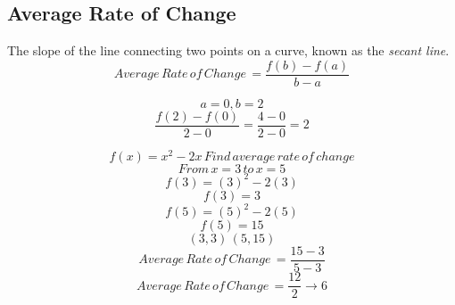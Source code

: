 \subsection{Average Rate of Change}
\begin{definition}
  The slope of the line connecting two points on a curve, known as the \textit{secant line}.
  $$Average \, Rate \, of \, Change \, = \frac{f(b) - f(a)}{b - a}$$
\end{definition}

\begin{example}[Graph] 
  \hfill
  \begin{center}
  \end{center}
  $$a = 0, b = 2$$
  $$\frac{f(2) - f(0)}{2 - 0} = \frac{4 - 0}{2 - 0} = 2$$
\end{example}

\begin{example}[Algebraic]
  $$f(x) = x^2 - 2x \, Find \, average \, rate \, of \, change$$
  $$From \, x = 3 \, to \, x = 5$$
  $$f(3) = (3)^2 - 2(3)$$
  $$f(3) = 3$$
  $$f(5) = (5)^2 - 2(5)$$
  $$f(5) = 15$$
  $$(3, 3) \, (5, 15)$$
  $$Average \, Rate \, of \, Change \, = \frac{15 - 3}{5 - 3}$$
  $$Average \, Rate \, of \, Change \, = \frac{12}{2} \to 6$$
\end{example}

